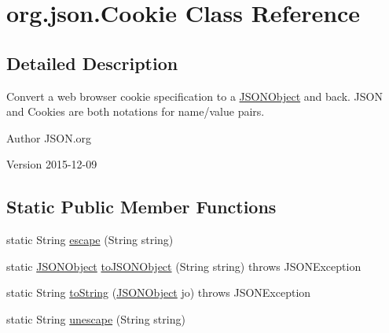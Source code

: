 \hypertarget{classorg_1_1json_1_1Cookie}{\section{org.\-json.\-Cookie Class Reference}
\label{classorg_1_1json_1_1Cookie}
}


\subsection{Detailed Description}
Convert a web browser cookie specification to a \hyperlink{classorg_1_1json_1_1JSONObject}{J\-S\-O\-N\-Object} and back. J\-S\-O\-N and Cookies are both notations for name/value pairs. \begin{DoxyAuthor}{Author}
J\-S\-O\-N.\-org 
\end{DoxyAuthor}
\begin{DoxyVersion}{Version}
2015-\/12-\/09 
\end{DoxyVersion}
\subsection*{Static Public Member Functions}
\begin{DoxyCompactItemize}
\item 
static String \hyperlink{classorg_1_1json_1_1Cookie_a4422021192515d995de2cef87d7836f2}{escape} (String string)
\item 
static \hyperlink{classorg_1_1json_1_1JSONObject}{J\-S\-O\-N\-Object} \hyperlink{classorg_1_1json_1_1Cookie_aaa6ae4ad2aa1db11eef24362049ce982}{to\-J\-S\-O\-N\-Object} (String string)  throws J\-S\-O\-N\-Exception 
\item 
static String \hyperlink{classorg_1_1json_1_1Cookie_a474a31a5f0b4f23d94b11c69e1d62cd1}{to\-String} (\hyperlink{classorg_1_1json_1_1JSONObject}{J\-S\-O\-N\-Object} jo)  throws J\-S\-O\-N\-Exception 
\item 
static String \hyperlink{classorg_1_1json_1_1Cookie_aea680b85e70e5a4bb34279c00b4c4bdd}{unescape} (String string)
\end{DoxyCompactItemize}


